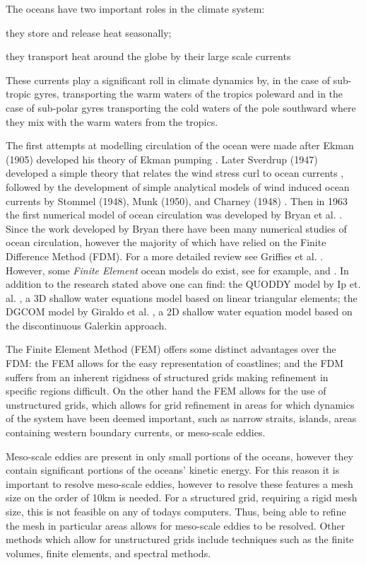 The oceans have two important roles in the climate system:
\begin{inparaenum}[1)]\item they store and release heat seasonally; \item
they transport heat around the globe by their large scale currents
\end{inparaenum} These currents play a significant roll in climate dynamics
by, in the case of sub-tropic gyres, transporting the warm waters of the
tropics poleward and in the case of sub-polar gyres transporting the cold
waters of the pole southward where they mix with the warm waters from the
tropics.

The first attempts at modelling circulation of the ocean were made after Ekman
(1905) developed his theory of Ekman pumping \cite{Ekman1905}. Later Sverdrup
(1947) developed a simple theory that relates the wind stress curl to ocean
currents \cite{Sverdrup1947}, followed by the development of simple analytical
models of wind induced ocean currents by Stommel (1948), Munk (1950), and
Charney (1948) \cite{Stommel1948,Munk1950,Charney1948}. Then in 1963 the first
numerical model of ocean circulation was developed by Bryan et al.
\cite{Bryan1963}. Since the work developed by Bryan there have been many
numerical studies of ocean circulation, however the majority of which have
relied on the Finite Difference Method (FDM). For a more detailed review see
Griffies et al. \cite{Griffies2000}. However, some \emph{Finite Element} ocean
models do exist, see for example, \cite{Fix} and \cite{Myers}. In addition to
the research stated above one can find: the QUODDY model by Ip et. al.
\cite{Ip1995}, a 3D shallow water equations model based on linear triangular
elements; the DGCOM model by Giraldo et al. \cite{GiraldoWWW}, a 2D shallow
water equation model based on the discontinuous Galerkin approach.

The Finite Element Method (FEM) offers some distinct advantages over the FDM:
the FEM allows for the easy representation of coastlines; and the FDM suffers
from an inherent rigidness of structured grids making refinement in specific
regions difficult. On the other hand the FEM allows for the use of
unstructured grids, which allows for grid refinement in areas for which
dynamics of the system have been deemed important, such as narrow straits,
islands, areas containing western boundary currents, or meso-scale eddies.

Meso-scale eddies are present in only small portions of the oceans, however they
contain significant portions of the oceans' kinetic energy. For this reason it
is important to resolve meso-scale eddies, however to resolve these features a
mesh size on the order of 10km is needed. For a structured grid, requiring a
rigid mesh size, this is not feasible on any of todays computers. Thus, being
able to refine the mesh in particular areas allows for meso-scale eddies to be
resolved. Other methods which allow for unstructured grids include techniques
such as the finite volumes, finite elements, and spectral methods. 

